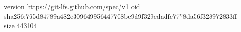 version https://git-lfs.github.com/spec/v1
oid sha256:765d84789a482e309649956447708be9d9f329edadfc7778da56f328972833ff
size 443104
